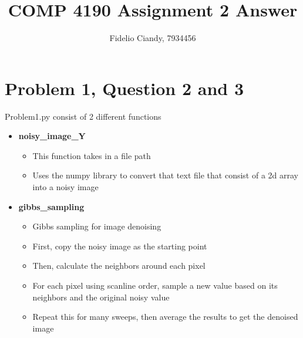 \documentclass[12pt,fleqn]{article}
\title{COMP 4190 Assignment 2 Answer}
\author{Fidelio Ciandy, 7934456}
\date{}
\begin{document}
\maketitle



\section*{Problem 1, Question 2 and 3}
Problem1.py consist of 2 different functions

\begin{itemize}
  \item \textbf{noisy\_image\_Y}
  \begin{itemize}
    \item This function takes in a file path
    \item Uses the numpy library to convert that text file that consist of a 2d array into a noisy image
  \end{itemize}

  \item \textbf{gibbs\_sampling}
  \begin{itemize}
    \item Gibbs sampling for image denoising
    \item First, copy the noisy image as the starting point
    \item Then, calculate the neighbors around each pixel
    \item For each pixel using scanline order, sample a new value based on its neighbors and the original noisy value
    \item Repeat this for many sweeps, then average the results to get the denoised image
  \end{itemize}
\end{itemize}


\end{document}
